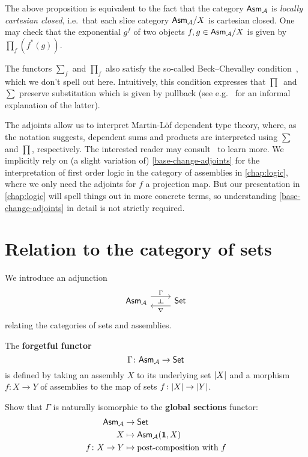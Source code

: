The above proposition is equivalent to the fact that the category \(\mathsf{Asm}_{\mathcal A}\)
is \emph{locally cartesian closed}, i.e.\ that each slice category
\(\mathsf{Asm}_{\mathcal A}/X\) is cartesian closed.
%
One may check that the exponential \(g^f\) of two objects
\(f,g \in \mathsf{Asm}_{\mathcal A}/X\) is given by \(\prod_f(f^\ast(g))\).

The functors \(\sum_f\) and \(\prod_f\) also satisfy the so-called
Beck--Chevalley condition~\cite[Theorem~4.4]{Streicher2018}, which we don't
spell out here. Intuitively, this condition expresses that
\(\prod\)~and~\(\sum\) preserve substitution which is given by pullback (see
e.g.~\cite{Bauer2012} for an informal explanation of the latter).

The adjoints allow us to interpret Martin-L\"of dependent type theory, where, as
the notation suggests, dependent sums and products are interpreted using
\(\sum\) and \(\prod\), respectively. The interested reader may
consult~\cite{Seely1984,Jacobs1999,Streicher1991} to learn more.
%
We implicitly rely on (a slight variation of) \cref{base-change-adjoints} for
the interpretation of first order logic in the category of assemblies in
\cref{chap:logic}, where we only need the adjoints for \(f\) a projection
map.
%
But our presentation in \cref{chap:logic} will spell things out in more concrete
terms, so understanding \cref{base-change-adjoints} in detail is not strictly
required.

\section{Relation to the category of sets}

We introduce an adjunction
\[
\begin{tikzcd}
\mathbb{\Asm{\AA}}
\arrow[r, "\Gamma"{name=F}, shift left=2mm] &
\mathbb{\Set}
\arrow[l, "\nabla"{name=G}, shift left=2mm]
\arrow[phantom, from=F, to=G, "\dashv" rotate=-90]
\end{tikzcd}
\]
relating the categories of sets and assemblies.

\begin{definition}
  The \textbf{forgetful functor}
  \[
    \Gamma \colon \mathsf{Asm}_{\mathcal A} \to \mathsf{Set}
  \]
  is defined by taking an assembly \(X\) to its underlying set \(\lvert X\rvert\)
  and a morphism \(f \colon X \to Y\) of assemblies to the map of sets
  \(f \colon \lvert X\rvert \to \lvert Y\rvert\).
\end{definition}

\begin{exercise}\label{exer:Gamma-global-sections}
  Show that \(\Gamma\) is naturally isomorphic to the \textbf{global sections}
  functor:
  \begin{align*}
    \mathsf{Asm}_{\mathcal A} &\to \mathsf{Set} \\
    X &\mapsto \mathsf{Asm}_{\mathcal A}(\mathbf 1,X) \\
    f \colon X \to Y &\mapsto \text{post-composition with \(f\)}
  \end{align*}
\end{exercise}

